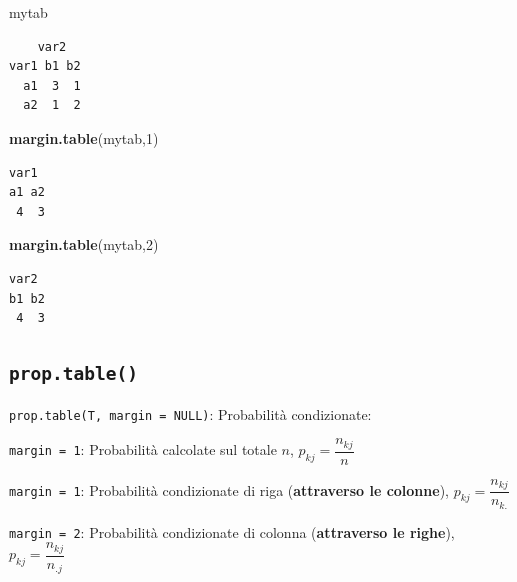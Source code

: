 \documentclass[
  a4paper,
  DIV=11,
  numbers=noendperiod]{scrreprt}
\newenvironment{Shaded}{\begin{snugshade}}{\end{snugshade}}
\newcommand{\DecValTok}[1]{\textcolor[rgb]{0.00,0.00,0.81}{#1}}
\newcommand{\FunctionTok}[1]{\textcolor[rgb]{0.13,0.29,0.53}{\textbf{#1}}}
\newcommand{\NormalTok}[1]{#1}
\begin{document}
\begin{Shaded}
\begin{Highlighting}[]
\NormalTok{mytab}
\end{Highlighting}
\end{Shaded}

\begin{verbatim}
    var2
var1 b1 b2
  a1  3  1
  a2  1  2
\end{verbatim}

\begin{Shaded}
\begin{Highlighting}[]
\FunctionTok{margin.table}\NormalTok{(mytab,}\DecValTok{1}\NormalTok{)  }
\end{Highlighting}
\end{Shaded}

\begin{verbatim}
var1
a1 a2 
 4  3 
\end{verbatim}

\begin{Shaded}
\begin{Highlighting}[]
\FunctionTok{margin.table}\NormalTok{(mytab,}\DecValTok{2}\NormalTok{)  }
\end{Highlighting}
\end{Shaded}

\begin{verbatim}
var2
b1 b2 
 4  3 
\end{verbatim}

\subsection{\texorpdfstring{\texttt{prop.table()}}{prop.table()}}\label{prop.table}

\texttt{prop.table(T,\ margin\ =\ NULL)}: Probabilità condizionate:

\begin{tcolorbox}[enhanced jigsaw, toprule=.15mm, left=2mm, leftrule=.75mm, breakable, coltitle=black, title={Tip}, bottomtitle=1mm, opacitybacktitle=0.6, toptitle=1mm, titlerule=0mm, bottomrule=.15mm, colframe=quarto-callout-tip-color-frame, arc=.35mm, rightrule=.15mm, opacityback=0, colbacktitle=quarto-callout-tip-color!10!white, colback=white]

\texttt{margin\ =\ 1}: Probabilità calcolate sul totale \(n\),
\(p_{kj} = \dfrac{n_{kj}}{n}\)

\texttt{margin\ =\ 1}: Probabilità condizionate di riga
(\textbf{attraverso le colonne}), \(p_{kj} = \dfrac{n_{kj}}{n_{k.}}\)

\texttt{margin\ =\ 2}: Probabilità condizionate di colonna
(\textbf{attraverso le righe}), \(p_{kj} = \dfrac{n_{kj}}{n_{.j}}\)

\end{tcolorbox}
\end{document}
